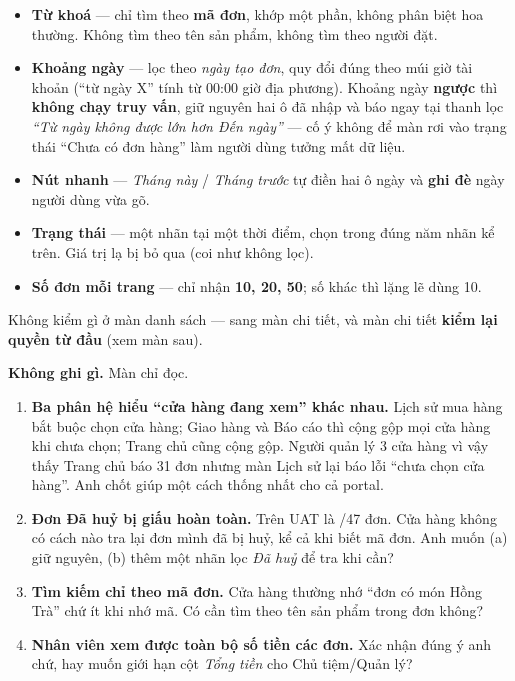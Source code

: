 \begin{itemize}[leftmargin=*]
  \item \textbf{Từ khoá} --- chỉ tìm theo \textbf{mã đơn}, khớp một phần, không phân biệt hoa
        thường. Không tìm theo tên sản phẩm, không tìm theo người đặt.
  \item \textbf{Khoảng ngày} --- lọc theo \emph{ngày tạo đơn}, quy đổi đúng theo múi giờ tài
        khoản (``từ ngày X'' tính từ 00:00 giờ địa phương). Khoảng ngày \textbf{ngược} thì
        \textbf{không chạy truy vấn}, giữ nguyên hai ô đã nhập và báo ngay tại thanh lọc
        \emph{``Từ ngày không được lớn hơn Đến ngày''} --- cố ý không để màn rơi vào trạng thái
        ``Chưa có đơn hàng'' làm người dùng tưởng mất dữ liệu.
  \item \textbf{Nút nhanh} --- \emph{Tháng này} / \emph{Tháng trước} tự điền hai ô ngày và
        \textbf{ghi đè} ngày người dùng vừa gõ.
  \item \textbf{Trạng thái} --- một nhãn tại một thời điểm, chọn trong đúng năm nhãn kể trên.
        Giá trị lạ bị bỏ qua (coi như không lọc).
  \item \textbf{Số đơn mỗi trang} --- chỉ nhận \textbf{10, 20, 50}; số khác thì lặng lẽ dùng 10.
\end{itemize}


Không kiểm gì ở màn danh sách --- sang màn chi tiết, và màn chi tiết \textbf{kiểm lại quyền từ
đầu} (xem màn sau).

\mghi

\textbf{Không ghi gì.} Màn chỉ đọc.

\mhoi

\begin{ask}
\begin{enumerate}[leftmargin=*]
  \item \textbf{Ba phân hệ hiểu ``cửa hàng đang xem'' khác nhau.} Lịch sử mua hàng bắt buộc
        chọn cửa hàng; Giao hàng và Báo cáo thì cộng gộp mọi cửa hàng khi chưa chọn; Trang chủ
        cũng cộng gộp. Người quản lý 3 cửa hàng vì vậy thấy Trang chủ báo 31 đơn nhưng màn Lịch
        sử lại báo lỗi ``chưa chọn cửa hàng''. Anh chốt giúp một cách thống nhất cho cả portal.
  \item \textbf{Đơn Đã huỷ bị giấu hoàn toàn.} Trên UAT là /47 đơn. Cửa hàng không có
        cách nào tra lại đơn mình đã bị huỷ, kể cả khi biết mã đơn. Anh muốn (a) giữ nguyên,
        (b) thêm một nhãn lọc \emph{Đã huỷ} để tra khi cần?
  \item \textbf{Tìm kiếm chỉ theo mã đơn.} Cửa hàng thường nhớ ``đơn có món Hồng Trà'' chứ ít
        khi nhớ mã. Có cần tìm theo tên sản phẩm trong đơn không?
  \item \textbf{Nhân viên xem được toàn bộ số tiền các đơn.} Xác nhận đúng ý anh chứ, hay muốn
        giới hạn cột \emph{Tổng tiền} cho Chủ tiệm/Quản lý?
\end{enumerate}
\end{ask}

